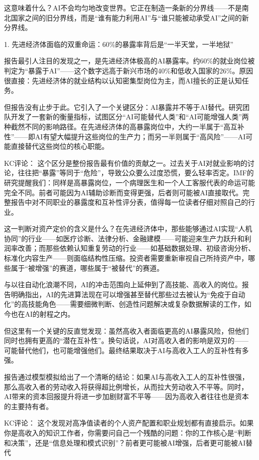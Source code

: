 \documentclass[11pt]{ctexart}
\begin{document}
这意味着什么？AI不会均匀地改变世界。它正在制造一条新的分界线——不是南北国家之间的旧分界线，而是“谁有能力利用AI”与“谁只能被动承受AI”之间的新分界线。

1. 先进经济体面临的双重命运：60\%的暴露率背后是“一半天堂，一半地狱”

报告最引人注目的发现之一，是先进经济体极高的AI暴露率。约60\%的就业岗位被判定为“暴露于AI”——这个数字远高于新兴市场的40\%和低收入国家的26\%。原因很直接：先进经济体的就业结构以认知密集型岗位为主，而AI擅长的正是认知任务。

但报告没有止步于此。它引入了一个关键区分：AI暴露并不等于AI替代。研究团队开发了一套新的衡量指标，试图区分“AI可能替代人类”和“AI可能增强人类”两种截然不同的影响路径。在先进经济体的高暴露岗位中，大约一半属于“高互补性”——即AI有望大幅提升这些岗位的生产力；而另一半则属于“高风险”——AI可能直接替代这些岗位的核心职能。

KC评论： 这个区分是整份报告最有价值的贡献之一。过去关于AI对就业影响的讨论，往往把“暴露”等同于“危险”，导致公众要么过度恐慌，要么轻率否定。IMF的研究提醒我们：同样是高暴露岗位，一个病理医生和一个人工客服代表的命运可能完全不同。前者可能因为AI辅助诊断而变得更强，后者则可能被AI直接取代。完整报告中对不同职业的暴露度和互补性评分表，值得每一位读者仔细对照自己的行业。

这一判断对资产定价的含义是什么？在先进经济体中，那些能够通过AI实现“人机协同”的行业——如医疗诊断、法律分析、金融建模——可能迎来生产力跃升和利润率改善；而那些依赖认知重复劳动的行业——如基础数据处理、初级咨询分析、标准化内容生产——则面临结构性压缩。投资者需要重新审视自己所持资产中，哪些属于“被增强”的赛道，哪些属于“被替代”的赛道。

与以往自动化浪潮不同，AI的冲击范围向上延伸到了高技能、高收入的岗位。报告明确指出，AI的先进算法现在可以增强甚至替代那些过去被认为“免疫于自动化”的高技能角色——需要细微判断、创造性问题解决或复杂数据解读的工作，如今也在AI的射程之内。

但这里有一个关键的反直觉发现：虽然高收入者面临更高的AI暴露风险，但他们同时也拥有更高的“潜在互补性”。换句话说，AI对高收入者的影响是双刃的——可能替代他们，也可能增强他们。最终结果取决于AI与高收入工人的互补性有多强。

报告通过模型模拟给出了一个清晰的结论：如果AI与高收入工人的互补性很强，那么高收入者的劳动收入将获得超比例增长，从而拉大劳动收入不平等。同时，AI带来的资本回报提升将进一步加剧财富不平等——因为高收入者往往也是资本的主要持有者。

KC评论： 这个发现对高净值读者的个人资产配置和职业规划都有直接启示。如果你是高收入的知识工作者，你需要问自己一个残酷的问题：你的工作核心是“判断和决策”，还是“信息处理和模式识别”？前者更可能被AI增强，后者更可能被AI替代
\end{document}
